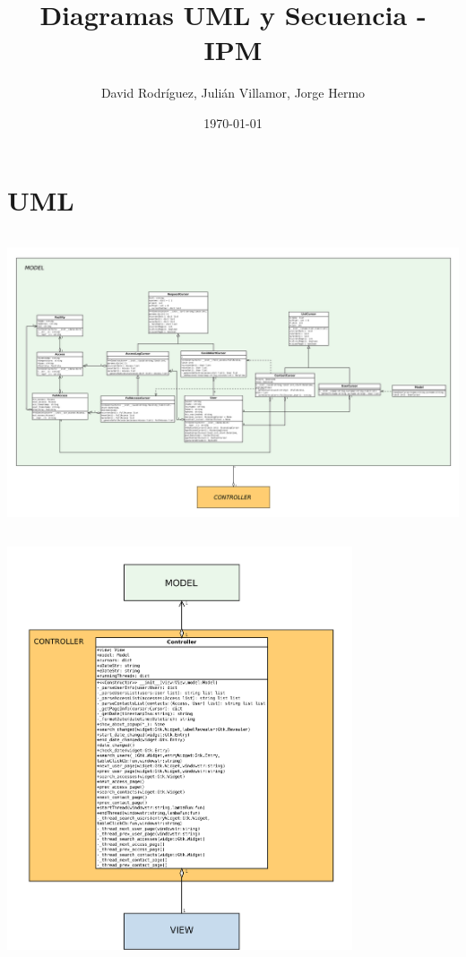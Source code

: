 \documentclass{article}
\title{Diagramas UML y Secuencia - IPM}
\author{David Rodríguez, Julián Villamor, Jorge Hermo}
\date{\today}
\begin{document}
\maketitle

\section{UML}

\begin{center}
	\includegraphics[height=330px]{model.pdf}
\end{center}

\begin{center}
	\includegraphics[height=450px]{controller.pdf}
\end{center}
\end{document}
